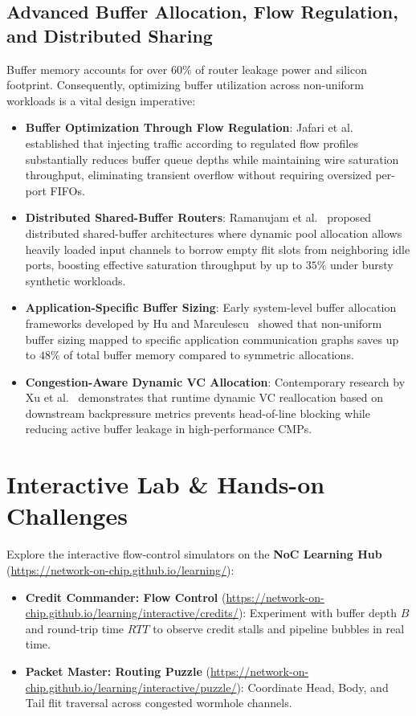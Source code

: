 \subsection{Advanced Buffer Allocation, Flow Regulation, and Distributed Sharing}
\label{sec:ch2_advanced_buffering}
Buffer memory accounts for over $60\%$ of router leakage power and silicon footprint. Consequently, optimizing buffer utilization across non-uniform workloads is a vital design imperative:
\begin{itemize}
    \item \textbf{Buffer Optimization Through Flow Regulation}: Jafari et al.~\cite{Jafari2010} established that injecting traffic according to regulated flow profiles substantially reduces buffer queue depths while maintaining wire saturation throughput, eliminating transient overflow without requiring oversized per-port FIFOs.
    \item \textbf{Distributed Shared-Buffer Routers}: Ramanujam et al.~\cite{Ramanujam2011} proposed distributed shared-buffer architectures where dynamic pool allocation allows heavily loaded input channels to borrow empty flit slots from neighboring idle ports, boosting effective saturation throughput by up to $35\%$ under bursty synthetic workloads.
    \item \textbf{Application-Specific Buffer Sizing}: Early system-level buffer allocation frameworks developed by Hu and Marculescu~\cite{Hu2006Buffer} showed that non-uniform buffer sizing mapped to specific application communication graphs saves up to $48\%$ of total buffer memory compared to symmetric allocations.
    \item \textbf{Congestion-Aware Dynamic VC Allocation}: Contemporary research by Xu et al.~\cite{Xu2025VC} demonstrates that runtime dynamic VC reallocation based on downstream backpressure metrics prevents head-of-line blocking while reducing active buffer leakage in high-performance CMPs.
\end{itemize}

\section{Interactive Lab \& Hands-on Challenges}
\label{sec:ch2_interactive}

Explore the interactive flow-control simulators on the \textbf{NoC Learning Hub} (\url{https://network-on-chip.github.io/learning/}):
\begin{itemize}
    \item \textbf{Credit Commander: Flow Control} (\url{https://network-on-chip.github.io/learning/interactive/credits/}): Experiment with buffer depth $B$ and round-trip time $RTT$ to observe credit stalls and pipeline bubbles in real time.
    \item \textbf{Packet Master: Routing Puzzle} (\url{https://network-on-chip.github.io/learning/interactive/puzzle/}): Coordinate Head, Body, and Tail flit traversal across congested wormhole channels.
\end{itemize}

